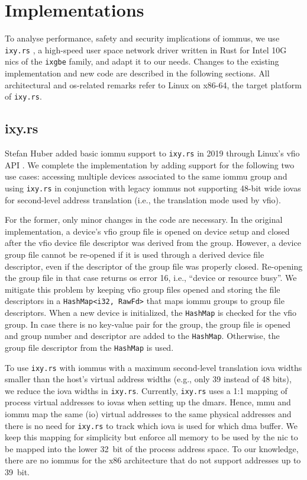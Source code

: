 \chapter{Implementations}
\label{chap:implementations}

To analyse performance, safety and security implications of \acp{iommu}, we use
\texttt{ixy.rs} \cite{ellmann2018writing}, a high-speed user space network
driver written in Rust for Intel 10G \acp{nic} of the \texttt{ixgbe} family, and
adapt it to our needs. Changes to the existing implementation and new code are
described in the following sections. All architectural and \ac{os}-related
remarks refer to Linux on x86-64, the target platform of \texttt{ixy.rs}.


\section{ixy.rs}
\label{sec:ixy_rs}

Stefan Huber added basic \ac{iommu} support to \texttt{ixy.rs} in 2019 through
Linux's \ac{vfio} API \cite{huber2019using}. We complete the implementation by
adding support for the following two use cases: accessing multiple devices
associated to the same \ac{iommu} group and using \texttt{ixy.rs} in conjunction
with legacy \acp{iommu} not supporting 48-bit wide \acp{iova} for second-level
address translation (i.e., the translation mode used by \ac{vfio}).

For the former, only minor changes in the code are necessary. In the original
implementation, a device's \ac{vfio} group file is opened on device setup and
closed after the \ac{vfio} device file descriptor was derived from the group.
However, a device group file cannot be re-opened if it is used through a derived
device file descriptor, even if the descriptor of the group file was properly
closed. Re-opening the group file in that case returns \ac{os} error 16, i.e.,
``device or resource busy''. We mitigate this problem by keeping \ac{vfio} group
files opened and storing the file descriptors in a \texttt{HashMap<i32, RawFd>}
that maps \ac{iommu} groups to group file descriptors. When a new device is
initialized, the \texttt{HashMap} is checked for the \ac{vfio} group. In case
there is no key-value pair for the group, the group file is opened and group
number and descriptor are added to the \texttt{HashMap}. Otherwise, the group
file descriptor from the \texttt{HashMap} is used.

To use \texttt{ixy.rs} with \acp{iommu} with a maximum second-level translation
\ac{iova} widths smaller than the host's virtual address widths (e.g., only 39
instead of 48 bits), we reduce the \ac{iova} widths in \texttt{ixy.rs}.
Currently, \texttt{ixy.rs} uses a 1:1 mapping of process virtual addresses to
\acp{iova} when setting up the \acp{dmar}. Hence, \ac{mmu} and \ac{iommu} map
the same (\ac{io}) virtual addresses to the same physical addresses and there is
no need for \texttt{ixy.rs} to track which \ac{iova} is used for which \ac{dma}
buffer. We keep this mapping for simplicity but enforce all memory to be used by
the \ac{nic} to be mapped into the lower 32~bit of the process address space.
To our knowledge, there are no \acp{iommu} for the x86 architecture that do not
support addresses up to 39~bit.

